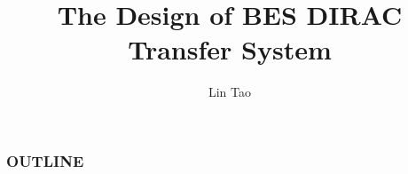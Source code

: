 \documentclass[20pt]{beamer}
\begin{document}
\title{The Design of BES DIRAC Transfer System}
\author{
    \texorpdfstring{Lin Tao
                    \newline
                    \href{mailto:lintao@ihep.ac.cn}
                    {\footnotesize{}}}
                    {Lin Tao}
}


\maketitle

\begin{frame}
    \frametitle{OUTLINE}
    \tableofcontents
\end{frame}

\end{document}
